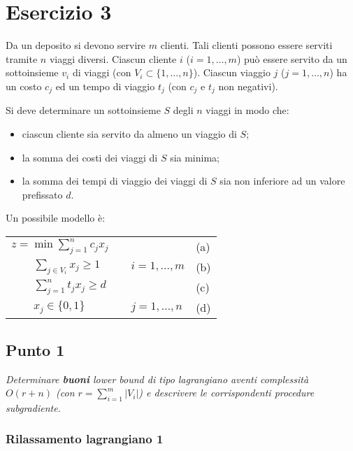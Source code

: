 \documentclass[11pt]{book}
\begin{document}
\chapter*{Esercizio 3}

Da un deposito si devono servire $m$ clienti. Tali clienti possono
essere serviti tramite $n$ viaggi diversi. Ciascun cliente $i$
($i=1,\dots,m$) pu\`o essere servito da un sottoinsieme $v_i$ di
viaggi (con $V_i \subset \{1,\dots,n\}$). Ciascun viaggio $j$
($j=1,\dots,n$) ha un costo $c_j$ ed un tempo di viaggio $t_j$ (con
$c_j$ e $t_j$ non negativi).

Si deve determinare un sottoinsieme $S$ degli $n$ viaggi in modo che:

\begin{itemize}
\item ciascun cliente sia servito da almeno un viaggio di $S$;
\item la somma dei costi dei viaggi di $S$ sia minima;
\item la somma dei tempi di viaggio dei viaggi di $S$ sia non
  inferiore ad un valore prefissato $d$.
\end{itemize}

Un possibile modello \`e:

\begin{center}
\begin{tabular}{lp{2cm}ll}
$z = \min \sum\limits_{j=1}^n c_jx_j$ & & & (a)\\
$\qquad \sum\limits_{j\in V_i}x_j \geq 1$ & & $i=1,\dots,m$ & (b)\\
$\qquad \sum\limits_{j=1}^n t_jx_j \geq d$ & & & (c)\\
$\qquad x_j \in\{0,1\}$ & & $j = 1,\dots,n$ & (d) \\
\end{tabular}
\end{center}

\section*{Punto 1}

\textit{Determinare \textbf{buoni} lower bound di tipo lagrangiano
  aventi complessit\`a $O(r+n)$ (con $r=\sum_{i=1}^m|V_i|$) e
  descrivere le corrispondenti procedure subgradiente.}

\subsection*{Rilassamento lagrangiano 1}
\end{document}
